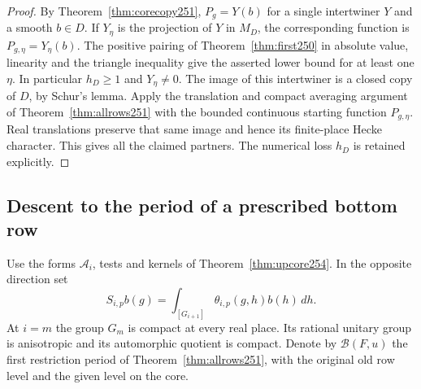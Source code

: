 \documentclass[a4paper,11pt]{article}
\theoremstyle{definition}
\theoremstyle{remark}
\numberwithin{equation}{section}
\begin{document}
\begin{proof}
By Theorem~\ref{thm:corecopy251}, \(P_g=Y(b)\) for a single
intertwiner \(Y\) and a smooth \(b\in D\). If \(Y_\eta\) is the
projection of \(Y\) in \(M_D\), the corresponding function is
\(P_{g,\eta}=Y_\eta(b)\). The positive pairing of
Theorem~\ref{thm:first250} in absolute value, linearity and the
triangle inequality give the asserted lower bound for at least one
\(\eta\). In particular \(h_D\ge1\) and \(Y_\eta\ne0\). The image
of this intertwiner is a closed copy of \(D\), by Schur's lemma.
Apply the translation and compact averaging argument of
Theorem~\ref{thm:allrows251} with the bounded continuous starting
function \(P_{g,\eta}\). Real translations preserve that same image
and hence its finite-place Hecke character. This gives all the claimed
partners. The numerical loss \(h_D\) is retained explicitly.
\end{proof}

\subsection{Descent to the period of a prescribed bottom row}\label{nav:V-35}
Use the forms \(\mathcal A_i\), tests and kernels of
Theorem~\ref{thm:upcore254}. In the opposite direction set
\[
 S_{i,p}b(g)=\int_{[G_{i+1}]}\theta_{i,p}(g,h)b(h)\,dh .
\]
At \(i=m\) the group \(G_m\) is compact at every real place.
Its rational unitary group is anisotropic and its automorphic
quotient is compact. Denote by \(\mathcal B(F,u)\) the first
restriction period of Theorem~\ref{thm:allrows251}, with the
original old row level and the given level on the core.
\end{document}
